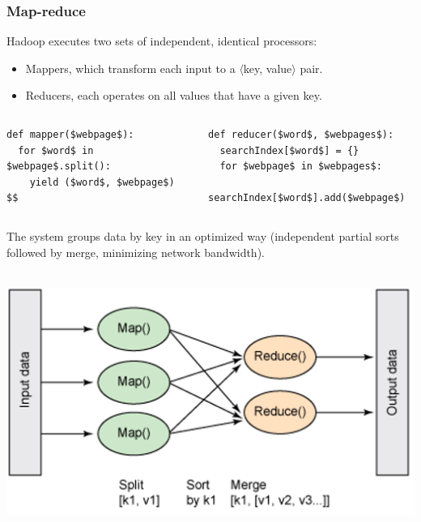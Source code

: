 \documentclass[compress]{beamer}
\begin{document}
\begin{frame}[fragile]
\frametitle{Map-reduce}

Hadoop executes two sets of independent, identical processors:
\begin{itemize}
\item Mappers, which transform each input to a $\langle$key, value$\rangle$ pair.
\item Reducers, each operates on all values that have a given key.
\end{itemize}

\vspace{-0.1 cm}
\begin{columns}
\begin{lstlisting}[frame=single]
def mapper($webpage$):
  for $word$ in $webpage$.split():
    yield ($word$, $webpage$)
$$
\end{lstlisting}
\begin{lstlisting}[frame=single]
def reducer($word$, $webpages$):
  searchIndex[$word$] = {}
  for $webpage$ in $webpages$:
    searchIndex[$word$].add($webpage$)
\end{lstlisting}
\end{columns}

The system groups data by key in an optimized way (independent partial sorts followed by merge, minimizing network bandwidth).

\vspace{0.2 cm}
\mbox{ } \hfill \includegraphics[width=0.6\linewidth]{PLOTS/mapreduce-diagram-by-ibm.png} \hfill \mbox{ }
\end{frame}
\end{document}
